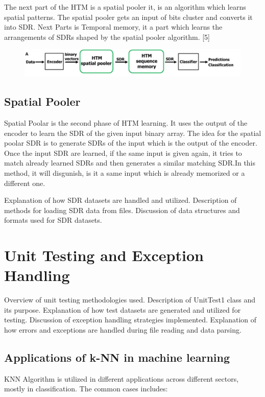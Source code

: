 \documentclass[conference]{IEEEtran}
\begin{document}
The next part of the HTM is a spatial pooler it, is an algorithm which learns spatial patterns. The spatial pooler gets an input of bits cluster and converts it into SDR. Next Parts is Temporal memory, it a part which learns the arrangements of SDRs shaped by the spatial pooler algorithm. [5]  


\begin{figure}[h]
\includegraphics[scale=.40]{HtmPipeline.png}
\end{figure}

\subsection{Spatial Pooler}
Spatial Poolar is the second phase of HTM learning. It uses the output of the encoder to learn the SDR of the given input binary array. The idea for the spatial poolar SDR is to generate SDRs of the input which is the output of the encoder. Once the input SDR are learned, if the same input is given again, it tries to match already learned SDRs and then generates a similar matching SDR.In this method, it will disgunish, is it a same input which is already memorized or a different one.   



 








Explanation of how SDR datasets are handled and utilized.
Description of methods for loading SDR data from files.
Discussion of data structures and formats used for SDR datasets.

\section{Unit Testing and Exception Handling}
Overview of unit testing methodologies used.
Description of UnitTest1 class and its purpose.
Explanation of how test datasets are generated and utilized for testing.
Discussion of exception handling strategies implemented.
Explanation of how errors and exceptions are handled during file reading and data parsing.

\subsection{Applications of k-NN in machine learning}
KNN Algorithm is utilized in different applications across different sectors, mostly in classification. The common cases includes:
\end{document}
